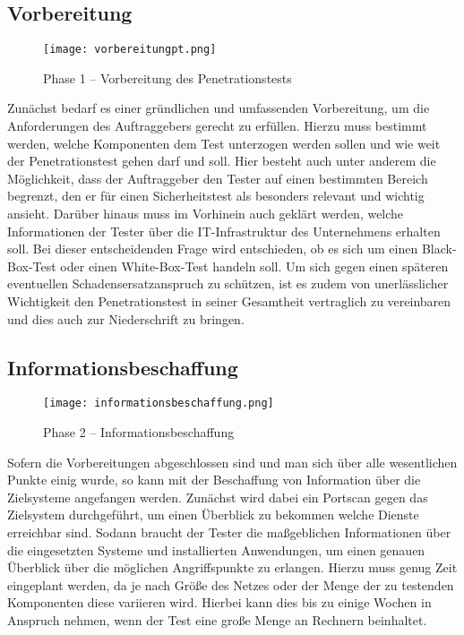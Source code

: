 \subsection{Vorbereitung}

\begin{figure}[h]
	\centering
	\texttt{[image: vorbereitungpt.png]}
	\caption{Phase 1 – Vorbereitung des Penetrationstests}
\end{figure}
Zunächst bedarf es einer gründlichen und umfassenden Vorbereitung, um die Anforderungen des Auftraggebers gerecht zu erfüllen. Hierzu muss bestimmt werden, welche Komponenten dem Test unterzogen werden sollen und wie weit der Penetrationstest gehen darf und soll. Hier besteht auch unter anderem die Möglichkeit, dass der Auftraggeber den Tester auf einen bestimmten Bereich begrenzt, den er für einen Sicherheitstest als besonders relevant und wichtig ansieht. Darüber hinaus muss im Vorhinein auch geklärt werden, welche Informationen der Tester über die IT-Infrastruktur des Unternehmens erhalten soll. Bei dieser entscheidenden Frage wird entschieden, ob es sich um einen Black-Box-Test oder einen White-Box-Test handeln soll. Um sich gegen einen späteren eventuellen Schadensersatzanspruch zu schützen, ist es zudem von unerlässlicher Wichtigkeit den Penetrationstest in seiner Gesamtheit vertraglich zu vereinbaren und dies auch zur Niederschrift zu bringen.

\subsection{Informationsbeschaffung}

\begin{figure}[h]
	\centering
	\texttt{[image: informationsbeschaffung.png]}
	\caption{Phase 2 – Informationsbeschaffung}
\end{figure}

Sofern die Vorbereitungen abgeschlossen sind und man sich über alle wesentlichen Punkte einig wurde, so kann mit der Beschaffung von Information über die Zielsysteme angefangen werden. Zunächst wird dabei ein Portscan gegen das Zielsystem durchgeführt, um einen Überblick zu bekommen welche Dienste erreichbar sind. Sodann braucht der Tester die maßgeblichen  Informationen über die eingesetzten Systeme und installierten Anwendungen, um einen genauen Überblick über die möglichen Angriffspunkte zu erlangen. Hierzu muss genug Zeit eingeplant werden, da je nach Größe des Netzes oder der Menge der zu testenden Komponenten diese variieren wird. Hierbei kann dies bis zu einige Wochen in Anspruch nehmen, wenn der Test eine große Menge an Rechnern beinhaltet.

